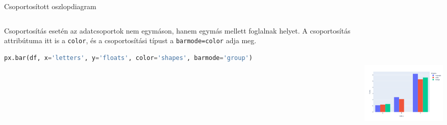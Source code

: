 \documentclass[english, aspectratio=169]{beamer}
\begin{document}
	\begin{frame}[fragile]{Csoportosított oszlopdiagram}
		\begin{columns}
			\begin{column}{.5\textwidth}
				Csoportosítás esetén az adatcsoportok nem egymáson, hanem egymás mellett foglalnak helyet. A csoportosítás attribútuma itt is a \texttt{color}, és a csoportosítási típust a \texttt{barmode=color} adja meg. 
				\vspace{0.3cm}
				\begin{lstlisting}[language=python]
px.bar(df, x='letters', y='floats', color='shapes', barmode='group')
				\end{lstlisting}
			\end{column}
			\begin{column}{.5\textwidth}
				\begin{center}
					\includegraphics[width=7cm, height=7cm, keepaspectratio]{images/plots_12.png}
				\end{center}			
			\end{column}
		\end{columns}
	\end{frame}
	
\end{document}
